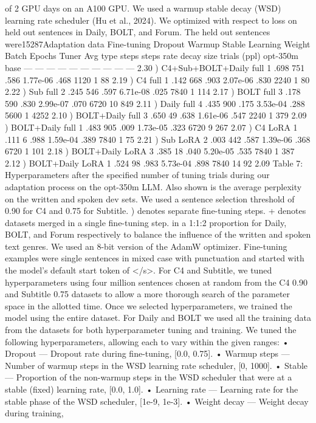 of 2 GPU days on an A100 GPU.
We used a warmup stable decay (WSD) learning
rate scheduler (Hu et al., 2024). We optimized
with respect to loss on held out sentences in Daily,
BOLT, and Forum. The held out sentences were15287Adaptation data Fine-tuning Dropout Warmup Stable Learning Weight Batch Epochs Tuner Avg
type steps steps rate decay size trials (ppl)
opt-350m base — — — — — — — — — — 2.30
) C4+Sub+BOLT+Daily full 1 .698 751 .586 1.77e-06 .468 1120 1 88 2.19
) C4 full 1 .142 668 .903 2.07e-06 .830 2240 1 80 2.22
) Sub full 2 .245 546 .597 6.71e-08 .025 7840 1 114 2.17
) BOLT full 3 .178 590 .830 2.99e-07 .070 6720 10 849 2.11
) Daily full 4 .435 900 .175 3.53e-04 .288 5600 1 4252 2.10
) BOLT+Daily full 3 .650 49 .638 1.61e-06 .547 2240 1 379 2.09
) BOLT+Daily full 1 .483 905 .009 1.73e-05 .323 6720 9 267 2.07
) C4 LoRA 1 .111 6 .988 1.59e-04 .389 7840 1 75 2.21
) Sub LoRA 2 .003 442 .587 1.39e-06 .368 6720 1 101 2.18
) BOLT+Daily LoRA 3 .385 18 .040 5.20e-05 .535 7840 1 387 2.12
) BOLT+Daily LoRA 1 .524 98 .983 5.73e-04 .898 7840 14 92 2.09
Table 7: Hyperparameters after the specified number of tuning trials during our adaptation process on the opt-350m
LLM. Also shown is the average perplexity on the written and spoken dev sets. We used a sentence selection
threshold of 0.90 for C4 and 0.75 for Subtitle. ) denotes separate fine-tuning steps. + denotes datasets merged in a
single fine-tuning step.
in a 1:1:2 proportion for Daily, BOLT, and Forum
respectively to balance the influence of the written
and spoken text genres. We used an 8-bit version
of the AdamW optimizer.
Fine-tuning examples were single sentences in
mixed case with punctuation and started with the
model’s default start token of </s>. For C4 and
Subtitle, we tuned hyperparameters using four million sentences chosen at random from the C4 0.90
and Subtitle 0.75 datasets to allow a more thorough
search of the parameter space in the allotted time.
Once we selected hyperparameters, we trained the
model using the entire dataset. For Daily and BOLT
we used all the training data from the datasets for
both hyperparameter tuning and training.
We tuned the following hyperparameters, allowing each to vary within the given ranges:
• Dropout — Dropout rate during fine-tuning, [0.0,
0.75].
• Warmup steps — Number of warmup steps in
the WSD learning rate scheduler, [0, 1000].
• Stable — Proportion of the non-warmup steps in
the WSD scheduler that were at a stable (fixed)
learning rate, [0.0, 1.0].
• Learning rate — Learning rate for the stable
phase of the WSD scheduler, [1e-9, 1e-3].
• Weight decay — Weight decay during training,
